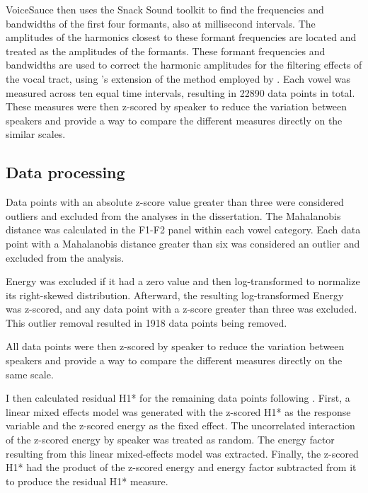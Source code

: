 VoiceSauce then uses the Snack Sound toolkit \citep{sjolanderSnackSoundToolkit2004} to find the frequencies and bandwidths of the first four formants, also at millisecond intervals. The amplitudes of the harmonics closest to these formant frequencies are located and treated as the amplitudes of the formants. These formant frequencies and bandwidths are used to correct the harmonic amplitudes for the filtering effects of the vocal tract, using \citeauthor{iseliAgeSexVowel2007}'s \citeyear{iseliAgeSexVowel2007} extension of the method employed by \citet{hansonGlottalCharacteristicsFemale1997}. Each vowel was measured across ten equal time intervals, resulting in 22890 data points in total. These measures were then z-scored by speaker to reduce the variation between speakers and provide a way to compare the different measures directly on the similar scales.

\subsection{Data processing} \label{sec:acousticlandscape:processing}
Data points with an absolute z-score value greater than three were considered outliers and excluded from the analyses in the dissertation. The Mahalanobis distance was calculated in the F1-F2 panel within each vowel category. Each data point with a Mahalanobis distance greater than six was considered an outlier and excluded from the analysis.  

Energy was excluded if it had a zero value and then log-transformed to normalize its right-skewed distribution. Afterward, the resulting log-transformed Energy was z-scored, and any data point with a z-score greater than three was excluded. This outlier removal resulted in 1918 data points being removed. 

All data points were then z-scored by speaker to reduce the variation between speakers and provide a way to compare the different measures directly on the same scale.

I then calculated residual H1* for the remaining data points following \citet{chaiH1H2Acoustic2022}. First, a linear mixed effects model was generated with the z-scored H1* as the response variable and the z-scored energy as the fixed effect. The uncorrelated interaction of the z-scored energy by speaker was treated as random. The energy factor resulting from this linear mixed-effects model was extracted. Finally, the z-scored H1* had the product of the z-scored energy and energy factor subtracted from it to produce the residual H1* measure. 

